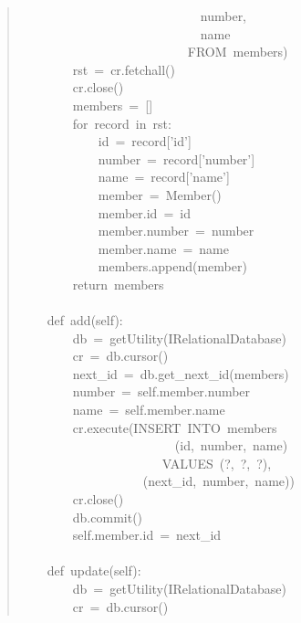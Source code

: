\documentclass[a4paper,openany,twoside,final]{book}
\begin{document}
\begin{quote}
{~~~~~~~~~~~~~~~~~~~~~~~~~~~~number,\\
~~~~~~~~~~~~~~~~~~~~~~~~~~~~name\\
~~~~~~~~~~~~~~~~~~~~~~~~~~FROM~members\textquotedbl{}\textquotedbl{}\textquotedbl{})\\
~~~~~~~~rst~=~cr.fetchall()\\
~~~~~~~~cr.close()\\
~~~~~~~~members~=~{[}{]}\\
~~~~~~~~for~record~in~rst:\\
~~~~~~~~~~~~id~=~record{[}'id'{]}\\
~~~~~~~~~~~~number~=~record{[}'number'{]}\\
~~~~~~~~~~~~name~=~record{[}'name'{]}\\
~~~~~~~~~~~~member~=~Member()\\
~~~~~~~~~~~~member.id~=~id\\
~~~~~~~~~~~~member.number~=~number\\
~~~~~~~~~~~~member.name~=~name\\
~~~~~~~~~~~~members.append(member)\\
~~~~~~~~return~members\\
~\\
~~~~def~add(self):\\
~~~~~~~~db~=~getUtility(IRelationalDatabase)\\
~~~~~~~~cr~=~db.cursor()\\
~~~~~~~~next\_id~=~db.get\_next\_id(\textquotedbl{}members\textquotedbl{})\\
~~~~~~~~number~=~self.member.number\\
~~~~~~~~name~=~self.member.name\\
~~~~~~~~cr.execute(\textquotedbl{}\textquotedbl{}\textquotedbl{}INSERT~INTO~members\\
~~~~~~~~~~~~~~~~~~~~~~~~(id,~number,~name)\\
~~~~~~~~~~~~~~~~~~~~~~VALUES~(?,~?,~?)\textquotedbl{}\textquotedbl{}\textquotedbl{},\\
~~~~~~~~~~~~~~~~~~~(next\_id,~number,~name))\\
~~~~~~~~cr.close()\\
~~~~~~~~db.commit()\\
~~~~~~~~self.member.id~=~next\_id\\
~\\
~~~~def~update(self):\\
~~~~~~~~db~=~getUtility(IRelationalDatabase)\\
~~~~~~~~cr~=~db.cursor()\\
}
\end{quote}
\end{document}
